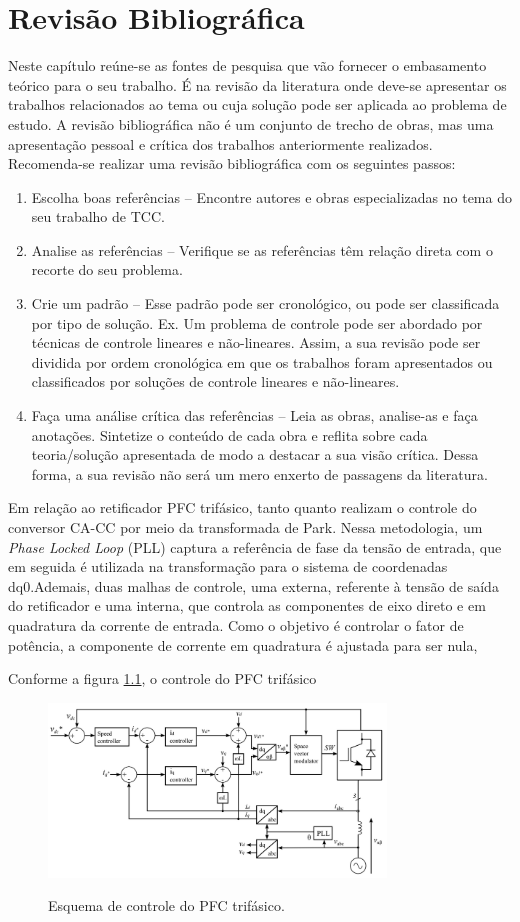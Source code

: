 \chapter{Revisão Bibliográfica}
Neste capítulo reúne-se as fontes de pesquisa que vão fornecer o embasamento teórico para o seu 
trabalho. É na revisão da literatura onde deve-se apresentar os trabalhos relacionados ao tema 
ou cuja solução pode ser aplicada ao problema de estudo. A revisão bibliográfica não é um 
conjunto de trecho de obras, mas uma apresentação pessoal e crítica dos trabalhos anteriormente 
realizados. Recomenda-se realizar uma revisão bibliográfica com os seguintes passos:
\begin{enumerate}
	\item Escolha boas referências – Encontre autores e obras especializadas no tema do seu trabalho de TCC.
	\item Analise as referências – Verifique se as referências têm relação direta com o recorte do seu problema.
	\item Crie um padrão – Esse padrão pode ser cronológico, ou pode ser classificada por tipo de solução. Ex. Um problema de controle pode ser abordado por técnicas de controle lineares e não-lineares. Assim, a sua revisão pode ser dividida por ordem cronológica em que os trabalhos foram apresentados ou classificados por soluções de controle lineares e não-lineares. 
	\item Faça uma análise crítica das referências – Leia as obras, analise-as e faça anotações. Sintetize o conteúdo de cada obra e reflita sobre cada teoria/solução apresentada de modo a destacar a sua visão crítica. Dessa forma, a sua revisão não será um mero enxerto de passagens da literatura.
\end{enumerate}

Em relação ao retificador PFC trifásico, tanto \cite{3phPlecs} quanto \cite{WANG2013/03} 
realizam o controle do conversor CA-CC por meio da transformada de Park. Nessa metodologia,
um \textit{Phase Locked Loop} (PLL) captura a referência de fase da tensão de entrada, que em seguida
 é utilizada na transformação para o sistema de coordenadas dq0.Ademais, duas malhas de controle, uma externa, referente à tensão de saída do retificador e uma interna,
 que controla as componentes de eixo direto e em quadratura da corrente de entrada. Como o objetivo é
 controlar o fator de potência, a componente de corrente em quadratura é ajustada para ser nula,

 Conforme a figura \ref{fig:controlepfc3ph}, o controle do PFC trifásico 

 \begin{figure}
 	\centering
	\caption{Esquema de controle do PFC trifásico.}
	\includegraphics[width=0.8\textwidth]{./Figuras/controlepfc3ph.png}
	\label{fig:controlepfc3ph}
 \end{figure}